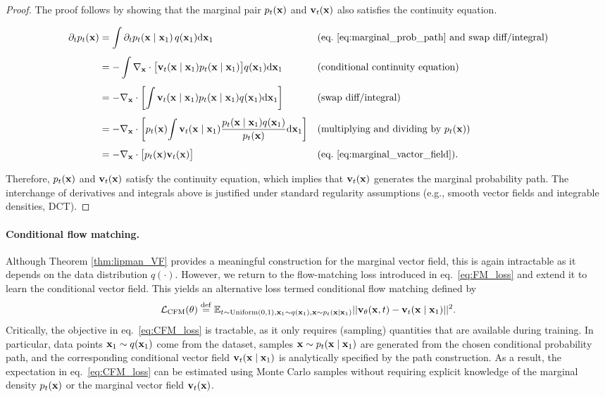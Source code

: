\begin{proof}
The proof follows by showing that the marginal pair 
$ p_t({ \mathbf{x}})$ and ${ \mathbf{v}}_t({ \mathbf{x}})$ also satisfies the continuity equation.

\begin{align*}
    \partial_t p_t({ \mathbf{x}}) 
    &= 
    \int \partial_t p_t({ \mathbf{x}} \mid { \mathbf{x}}_1)\, q({ \mathbf{x}}_1){\text{d}}{ \mathbf{x}}_1 
    &&\text{(eq.~\eqref{eq:marginal_prob_path} and swap diff/integral)} \\[4pt]
    &= 
    - \int \nabla_{ \mathbf{x}} \cdot 
    \big[ { \mathbf{v}}_t({ \mathbf{x}} \mid { \mathbf{x}}_1) p_t({ \mathbf{x}} \mid { \mathbf{x}}_1) \big] 
    q({ \mathbf{x}}_1){\text{d}}{ \mathbf{x}}_1 
    &&\text{(conditional continuity equation)} \\[4pt]
    &= 
    - \nabla_{ \mathbf{x}} \cdot 
    \left[\int 
    { \mathbf{v}}_t({ \mathbf{x}} \mid { \mathbf{x}}_1) p_t({ \mathbf{x}} \mid { \mathbf{x}}_1) 
    q({ \mathbf{x}}_1){\text{d}}{ \mathbf{x}}_1 \right] 
    &&\text{(swap diff/integral)} \\[4pt]
    &= 
    - \nabla_{ \mathbf{x}} \cdot 
    \left[
    p_t({ \mathbf{x}})\!
    \int { \mathbf{v}}_t({ \mathbf{x}} \mid { \mathbf{x}}_1)
    \frac{p_t({ \mathbf{x}} \mid { \mathbf{x}}_1) q({ \mathbf{x}}_1)}{p_t({ \mathbf{x}})}
    {\text{d}}{ \mathbf{x}}_1
    \right] 
    &&\text{(multiplying and dividing by $p_t({ \mathbf{x}})$)} \\[4pt]
    &= 
    - \nabla_{ \mathbf{x}} \cdot 
    \big[p_t({ \mathbf{x}}){ \mathbf{v}}_t({ \mathbf{x}})\big]
    &&\text{(eq.~\eqref{eq:marginal_vactor_field})} .
\end{align*}

Therefore, $p_t({ \mathbf{x}})$ and ${ \mathbf{v}}_t({ \mathbf{x}})$ satisfy the continuity equation, which implies that ${ \mathbf{v}}_t({ \mathbf{x}})$ generates the marginal probability path. The interchange of derivatives and integrals above is justified under standard regularity assumptions (e.g., smooth vector fields and integrable densities, DCT).
\end{proof}

\paragraph{Conditional flow matching.} Although Theorem \ref{thm:lipman_VF} provides a meaningful construction for the marginal vector field, this is again intractable as it depends on the data distribution $q(\cdot)$. However, we return to the flow-matching loss introduced in eq.~\eqref{eq:FM_loss}  and extend it to learn the conditional vector field. This yields an alternative loss termed conditional flow matching defined by 
\begin{equation}
    \label{eq:CFM_loss}    
    {\mathcal L}_\text{CFM}(\theta) \mathrel{\stackrel{\mathrm{def}}{=}} \mathbb{E}_{t\sim\text{Uniform}\left(0,1\right),{ \mathbf{x}}_1\sim q({ \mathbf{x}}_1), { \mathbf{x}}\sim p_t({ \mathbf{x}} \mid { \mathbf{x}}_1)}||{ \mathbf{v}}_\theta({ \mathbf{x}},t) - { \mathbf{v}}_t({ \mathbf{x}} \mid { \mathbf{x}}_1)||^2.
\end{equation}
Critically, the objective in  eq.~\eqref{eq:CFM_loss} is tractable, as it only requires (sampling) quantities that are available during training. In particular, data points ${ \mathbf{x}}_1 \sim q({ \mathbf{x}}_1)$ come from the  dataset, samples ${ \mathbf{x}} \sim p_t({ \mathbf{x}} \mid { \mathbf{x}}_1)$ are generated from the chosen conditional probability path, and the corresponding conditional
vector field ${ \mathbf{v}}_t({ \mathbf{x}} \mid { \mathbf{x}}_1)$ is analytically specified by the path construction. As a result, the expectation in
eq.~\eqref{eq:CFM_loss} can be estimated using Monte Carlo samples without requiring explicit knowledge of the marginal density $p_t({ \mathbf{x}})$ or the marginal vector field ${ \mathbf{v}}_t({ \mathbf{x}})$.

